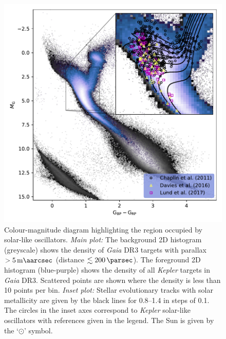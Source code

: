 \begin{figure}
    \centering
    \includegraphics{figures/hr-diagram.pdf}
    \caption[Colour-magnitude diagram highlighting the region occupied by dwarf and subgiant solar-like oscillators.]{Colour-magnitude diagram highlighting the region occupied by solar-like oscillators. 
    \emph{Main plot:} The background 2D histogram (greyscale) shows the density of \emph{Gaia} DR3 targets with parallax \(>\SI{5}{\milli\aarcsec}\) (distance \(\lesssim\SI{200}{\parsec}\)). The foreground 2D histogram (blue-purple) shows the density of all \emph{Kepler} targets in \emph{Gaia} DR3. Scattered points are shown where the density is less than 10 points per bin.
    \emph{Inset plot:} Stellar evolutionary tracks with solar metallicity are given by the black lines for \SIrange{0.8}{1.4}{\solarmass} in steps of \SI{0.1}{\solarmass}. The circles in the inset axes correspond to \emph{Kepler} solar-like oscillators with references given in the legend. The Sun is given by the `\(\odot\)' symbol.}
    \label{fig:hr-diagram}
\end{figure}

